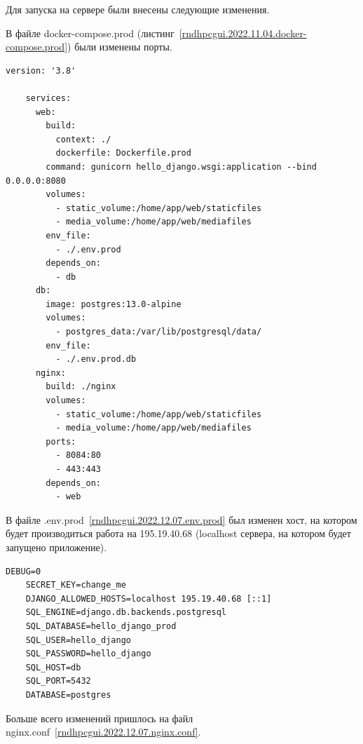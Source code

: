 \def\notedate{2022.11.04}
\def\currentauthor{Василян А.Р. (РК6-73Б)}


Для запуска на сервере были внесены следующие изменения.

	В файле \textsf{docker-compose.prod} (листинг~\ref{rndhpcgui.2022.11.04.docker-compose.prod}) были изменены порты.

\begin{lstlisting}[frame=single, label={rndhpcgui.2022.12.07.docker-compose.prod}, caption={Содержимое файла \textsf{docker-compose.prod.yml}}, language={docker-compose}] 
	version: '3.8'
	
	services:
	  web:
	    build:
	      context: ./
	      dockerfile: Dockerfile.prod
	    command: gunicorn hello_django.wsgi:application --bind 0.0.0.0:8080
	    volumes:
	      - static_volume:/home/app/web/staticfiles
	      - media_volume:/home/app/web/mediafiles
	    env_file:
	      - ./.env.prod
	    depends_on:
	      - db
	  db:
	    image: postgres:13.0-alpine
	    volumes:
	      - postgres_data:/var/lib/postgresql/data/
	    env_file:
	      - ./.env.prod.db
	  nginx:
	    build: ./nginx
	    volumes:
	      - static_volume:/home/app/web/staticfiles
	      - media_volume:/home/app/web/mediafiles
	    ports:
	      - 8084:80
	      - 443:443
	    depends_on:
	      - web
\end{lstlisting}

В файле \textsf{.env.prod}~\ref{rndhpcgui.2022.12.07.env.prod} был изменен хост, на котором будет производиться работа на 195.19.40.68 (localhost сервера, на котором будет запущено приложение).

\begin{lstlisting}[frame=single, label={rndhpcgui.2022.12.07.env.prod}, caption={Содержимое файла \textsf{.env.prod}}, language={aINIExample}] 
	DEBUG=0
	SECRET_KEY=change_me
	DJANGO_ALLOWED_HOSTS=localhost 195.19.40.68 [::1]
	SQL_ENGINE=django.db.backends.postgresql
	SQL_DATABASE=hello_django_prod
	SQL_USER=hello_django
	SQL_PASSWORD=hello_django
	SQL_HOST=db
	SQL_PORT=5432
	DATABASE=postgres
\end{lstlisting}

Больше всего изменений пришлось на файл \textsf{nginx.conf}~\ref{rndhpcgui.2022.12.07.nginx.conf}. 

